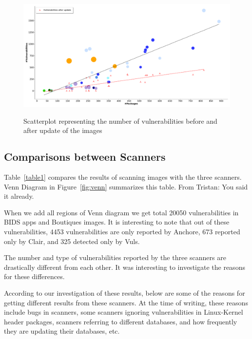 \documentclass[a4paper,num-refs]{oup-contemporary}
\newcommand{\tristan}[1]{\color{blue}From Tristan: #1\color{black}}
\begin{document}
\begin{figure}[b]
        {\includegraphics[width=\textwidth]
        {Figures/vulnwithupdate.pdf}}
        \caption{\label{fig:graph2} Scatterplot representing the number of vulnerabilities before and
        after update of the images}
      \end{figure}

\subsection{Comparisons between Scanners}

Table~\ref{table1} compares the results of scanning images with the three scanners.
Venn Diagram in Figure~\ref{fig:venn} summarizes this table. \tristan{You said it already.}

When we add all regions of Venn diagram
we get total 20050 vulnerabilities in BIDS apps and Boutiques images.
It is interesting to note that out of these vulnerabilities, 4453 vulnerabilities are only
reported by Anchore, 673 reported only by Clair, and 325 detected only by Vuls.

The number and type of vulnerabilities reported by the three scanners are drastically different from each other.
It was interesting to investigate the reasons for these differences.

According to our investigation of these results, below are some of the reasons for
getting different results from these scanners. At the time of writing, these reasons include bugs in scanners,
some scanners ignoring vulnerabilities in Linux-Kernel header packages, scanners referring to different databases,
and how frequently they are updating their databases, etc. 
\end{document}
